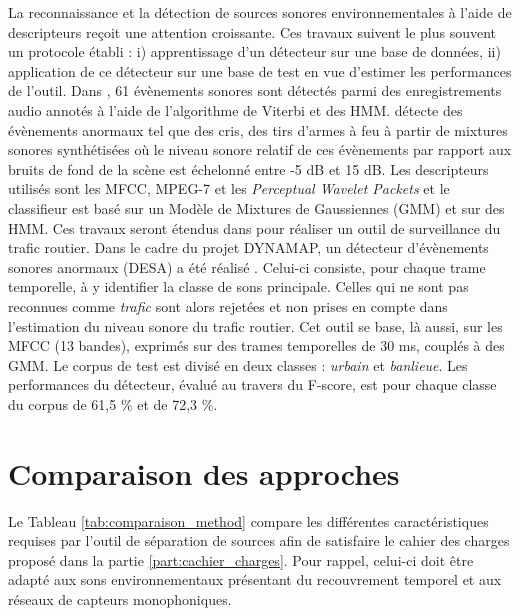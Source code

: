 La reconnaissance et la détection de sources sonores environnementales à l'aide de descripteurs \cite{dufaux2000automatic,defreville_automatic_2006} reçoit une attention croissante. Ces travaux suivent le plus souvent un protocole établi : i) apprentissage d'un détecteur sur une base de données, ii) application de ce détecteur sur une base de test en vue d'estimer les performances de l'outil. Dans \cite{mesaros2010acoustic}, 61 évènements sonores sont détectés parmi des enregistrements audio annotés à l'aide de l'algorithme de Viterbi et des HMM. \cite{ntalampiras2011probabilistic} détecte des évènements anormaux tel que des cris, des tirs d'armes à feu à partir de mixtures sonores synthétisées où le niveau sonore relatif de ces évènements par rapport aux bruits de fond de la scène est échelonné entre -5 dB et 15 dB. Les descripteurs utilisés sont les MFCC, MPEG-7 et les \textit{Perceptual Wavelet Packets} et le classifieur est basé sur un Modèle de Mixtures de Gaussiennes (GMM) et sur des HMM. Ces travaux seront étendus dans \cite{ntalampiras2014universal} pour réaliser un outil de surveillance du trafic routier. Dans le cadre du projet DYNAMAP, un détecteur d'évènements sonores anormaux (DESA) a été réalisé \cite{socoro2017anomalous}. Celui-ci consiste, pour chaque trame temporelle, à y identifier la classe de sons principale. Celles qui ne sont pas reconnues comme \textit{trafic} sont alors rejetées et non prises en compte dans l'estimation du niveau sonore du trafic routier. Cet outil se base, là aussi, sur les MFCC (13 bandes), exprimés sur des trames temporelles de 30 ms, couplés à des GMM. Le corpus de test est divisé en deux classes : \textit{urbain} et \textit{banlieue}. Les performances du détecteur, évalué au travers du F-score, est pour chaque classe du corpus de 61,5 $\%$ et de 72,3 $\%$.

\section{Comparaison des approches}\label{part:comparaison_method}

Le Tableau \ref{tab:comparaison_method} compare les différentes caractéristiques requises par l'outil de séparation de sources afin de satisfaire le cahier des charges proposé dans la partie \ref{part:cachier_charges}. Pour rappel, celui-ci doit être adapté aux sons environnementaux présentant du recouvrement temporel et aux réseaux de capteurs monophoniques.

